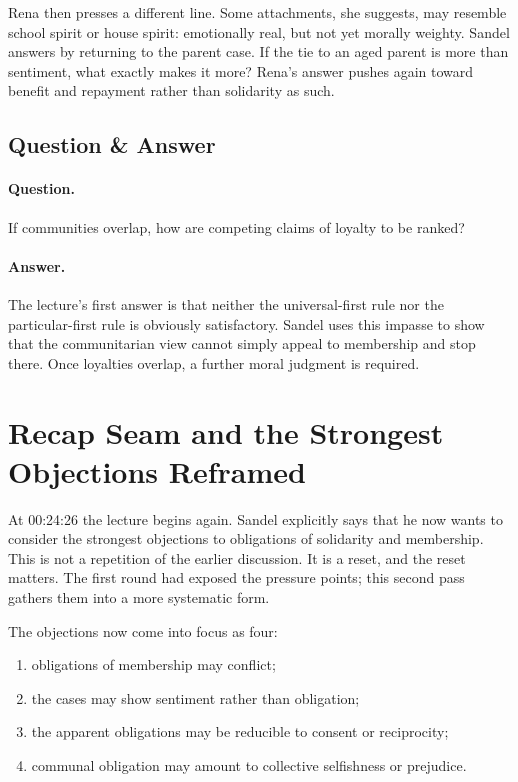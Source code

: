 Rena then presses a different line. Some attachments, she suggests, may resemble school spirit or house spirit: emotionally real, but not yet morally weighty. Sandel answers by returning to the parent case. If the tie to an aged parent is more than sentiment, what exactly makes it more? Rena's answer pushes again toward benefit and repayment rather than solidarity as such.

\subsection{Question \& Answer}

\paragraph{Question.} If communities overlap, how are competing claims of loyalty to be ranked?

\paragraph{Answer.} The lecture's first answer is that neither the universal-first rule nor the particular-first rule is obviously satisfactory. Sandel uses this impasse to show that the communitarian view cannot simply appeal to membership and stop there. Once loyalties overlap, a further moral judgment is required.

\section{Recap Seam and the Strongest Objections Reframed}

At 00:24:26 the lecture begins again. Sandel explicitly says that he now wants to consider the strongest objections to obligations of solidarity and membership. This is not a repetition of the earlier discussion. It is a reset, and the reset matters. The first round had exposed the pressure points; this second pass gathers them into a more systematic form.

The objections now come into focus as four:
\begin{enumerate}
\item obligations of membership may conflict;
\item the cases may show sentiment rather than obligation;
\item the apparent obligations may be reducible to consent or reciprocity;
\item communal obligation may amount to collective selfishness or prejudice.
\end{enumerate}

